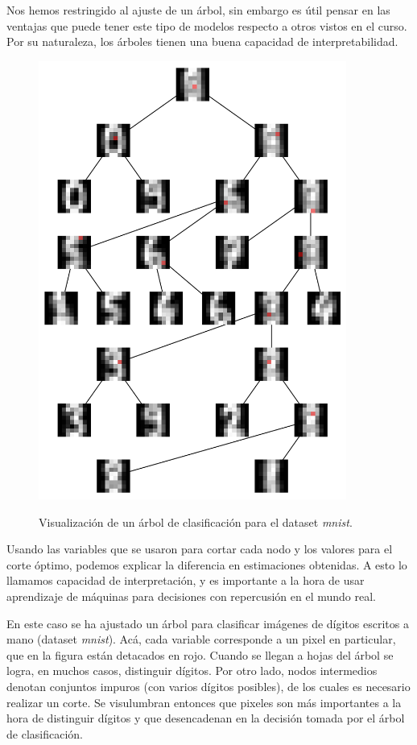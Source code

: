 Nos hemos restringido al ajuste de un árbol, sin embargo es útil pensar en las ventajas que puede tener este tipo de modelos respecto a otros vistos en el curso. Por su naturaleza, los árboles tienen una buena capacidad de interpretabilidad. %

\begin{figure}[ht]
	\centering
	\includegraphics[width=0.9\textwidth]{img/capN_interpretacion_arbol.png}\\
	\caption{Visualización de un árbol de clasificación para el dataset \textit{mnist}.}
\end{figure}

Usando las variables que se usaron para cortar cada nodo y los valores para el corte óptimo, podemos explicar la diferencia en estimaciones obtenidas. A esto lo llamamos capacidad de interpretación, y es importante a la hora de usar aprendizaje de máquinas para decisiones con repercusión en el mundo real.

En este caso se ha ajustado un árbol para clasificar imágenes de dígitos escritos a mano (dataset \textit{mnist}). Acá, cada variable corresponde a un pixel en particular, que en la figura están detacados en rojo. Cuando se llegan a hojas del árbol se logra, en muchos casos, distinguir dígitos. Por otro lado, nodos intermedios denotan conjuntos impuros (con varios dígitos posibles), de los cuales es necesario realizar un corte. Se visulumbran entonces que pixeles son más importantes a la hora de distinguir dígitos y que desencadenan en la decisión tomada por el árbol de clasificación.


